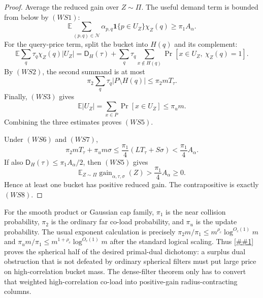 \documentclass[10pt]{article}
\newcommand{\cref}[1]{\ref{##1}}
\theoremstyle{definition}
\newcommand{\E}{\mathbb{E}}
\begin{document}
\begin{proof}
   Average the reduced gain over \(Z\sim\Pi\).  The useful demand term is bounded
   from below by \((WS1)\):
   \[
      \E\sum_{(p,q)\in\mathcal N}
      \alpha_{p,q}\mathbf 1\{p\in U_Z\}\chi_Z(q)
      \ge \pi_1A_\alpha .
   \]
   For the query-price term, split the bucket into \(H(q)\) and its complement:
   \[
      \E\sum_q\tau_q\chi_Z(q)|U_Z|
      =
      \mathsf D_H(\tau)
      +
      \sum_q\tau_q
      \sum_{x\notin H(q)}
      \Pr[x\in U_Z,\ \chi_Z(q)=1].
   \]
   By \((WS2)\), the second summand is at most
   \[
      \pi_2\sum_q\tau_q|P\setminus H(q)|
      \le \pi_2mT_\tau .
   \]
   Finally, \((WS3)\) gives
   \[
      \E |U_Z|=\sum_{x\in P}\Pr[x\in U_Z]\le \pi_um.
   \]
   Combining the three estimates proves \((WS5)\).

   Under \((WS6)\) and \((WS7)\),
   \[
      \pi_2mT_\tau+\pi_um\sigma
      \le
      \frac{\pi_1}{4}(LT_\tau+S\sigma)
      <
      \frac{\pi_1}{4}A_\alpha .
   \]
   If also \(\mathsf D_H(\tau)\le\pi_1A_\alpha/2\), then \((WS5)\) gives
   \[
      \E_{Z\sim\Pi}\operatorname{gain}_{\alpha,\tau,\sigma}(Z)
      >
      \frac{\pi_1}{4}A_\alpha\ge0.
   \]
   Hence at least one bucket has positive reduced gain.  The contrapositive is
   exactly \((WS8)\).
\end{proof}

For the smooth product or Gaussian cap family, \(\pi_1\) is the near collision
probability, \(\pi_2\) is the ordinary far co-load probability, and \(\pi_u\) is
the update probability.  The usual exponent calculation is precisely
\(\pi_2m/\pi_1\le m^{\rho_c}\log^{O_c(1)}m\) and
\(\pi_um/\pi_1\le m^{1+\rho_c}\log^{O_c(1)}m\) after the standard logical
scaling.  Thus \cref{lem:weighted-spherical-reduced-gain} proves the spherical
half of the desired primal-dual dichotomy: a surplus dual obstruction that is
not defeated by ordinary spherical filters must put large price on
high-correlation bucket mass.  The dense-filter theorem only has to convert that
weighted high-correlation co-load into positive-gain radius-contracting columns.
\end{document}
